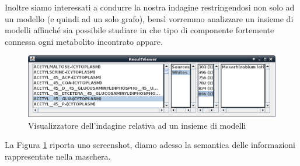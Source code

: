 Inoltre siamo interessati a condurre la nostra indagine restringendosi
non solo ad un modello (e quindi ad un solo grafo), bens\`i vorremmo
analizzare un insieme di modelli affinch\'e sia possibile studiare in
che tipo di componente fortemente connessa ogni metabolito incontrato
appare.

\begin{figure}
  \centering
  \includegraphics[scale=.5,
  angle=90]{images/ResultViewer-execution.eps}
  \caption{Visualizzatore dell'indagine relativa ad un insieme di
    modelli}
  \label{fig:result-viewer-scc}
\end{figure}
La Figura \ref{fig:result-viewer-scc} riporta uno screenshot, diamo
adesso la semantica delle informazioni rappresentate nella maschera.

